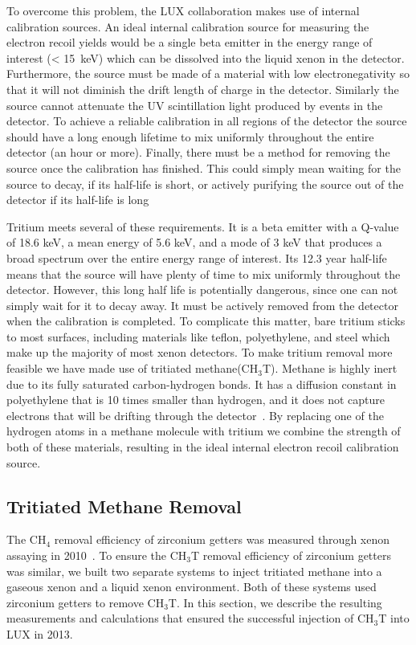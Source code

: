 To overcome this problem, the LUX collaboration makes use of internal calibration sources. An ideal internal calibration source for measuring the electron recoil yields would be a single beta emitter in the energy range of interest (< 15~keV) which can be dissolved into the liquid xenon in the detector. Furthermore, the source must be made of a material with low electronegativity so that it will not diminish the drift length of charge in the detector. Similarly the source cannot attenuate the UV scintillation light produced by events in the detector. To achieve a reliable calibration in all regions of the detector the source should have a long enough lifetime to mix uniformly throughout the entire detector (an hour or more). Finally, there must be a method for removing the source once the calibration has finished. This could simply mean waiting for the source to decay, if its half-life is short, or actively purifying the source out of the detector if its half-life is long

Tritium meets several of these requirements. It is a beta emitter with a Q-value of 18.6 keV, a mean energy of 5.6 keV, and a mode of 3 keV that produces a broad spectrum over the entire energy range of interest. Its 12.3 year half-life means that the source will have plenty of time to mix uniformly throughout the detector. However, this long half life is potentially dangerous, since one can not simply wait for it to decay away. It must be actively removed from the detector when the calibration is completed. To complicate this matter, bare tritium sticks to most surfaces, including materials like teflon, polyethylene, and steel which make up the majority of most xenon detectors. To make tritium removal more feasible we have made use of tritiated methane(CH$_3$T). Methane is highly inert due to its fully saturated carbon-hydrogen bonds. It has a diffusion constant in polyethylene that is 10 times smaller than
hydrogen, and it does not capture electrons that will be drifting through the detector~\cite{TeflonActivationEnergy}. By replacing one of the hydrogen atoms in a methane molecule with tritium we combine the strength of both of these materials, resulting in the ideal internal electron recoil calibration source.

\subsection{Tritiated Methane Removal} \label{UMDRemoval}

The CH$_4$ removal efficiency of zirconium getters was measured through xenon assaying in 2010~\cite{Dobi:2010ai}. To ensure the CH$_3$T removal efficiency of zirconium getters was similar, we built two separate systems to inject tritiated methane into a gaseous xenon and a liquid xenon environment. Both of these systems used zirconium getters to remove CH$_3$T.  In this section, we describe the resulting measurements and calculations that ensured the successful injection of CH$_3$T into LUX in 2013.

